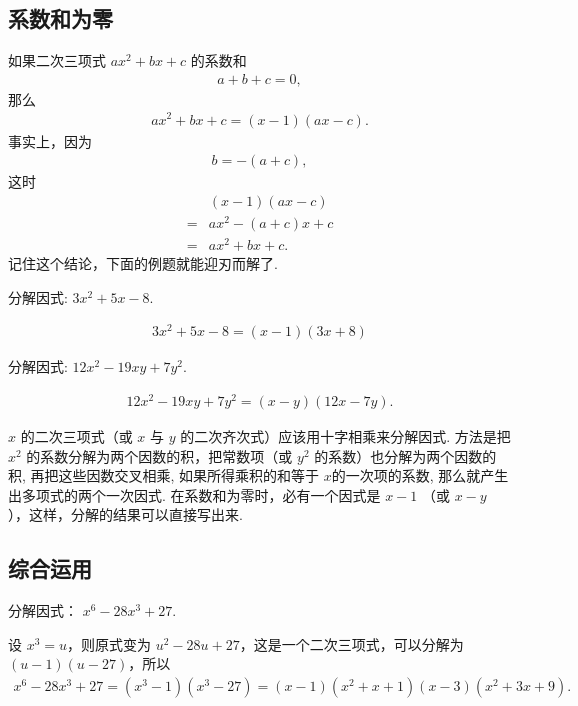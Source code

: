 \subsection{系数和为零}
如果二次三项式 $a x^{2}+b x+c$ 的系数和
\begin{align*}
	a+b+c=0,
\end{align*}
那么
\begin{align*}
	a x^{2}+b x+c=(x-1)(a x-c) .
\end{align*}
事实上，因为
\begin{align*}
	b=-(a+c),
\end{align*}
这时
\begin{align*}
	  & (x-1)(a x-c)      \\
	= & a x^{2}-(a+c) x+c \\
	= & a x^{2}+b x+c .
\end{align*}
记住这个结论，下面的例题就能迎刃而解了.

\begin{example}
	分解因式: $3 x^{2}+5 x-8$.
\end{example}
\begin{solution}
	\begin{align*}
		3 x^{2}+5 x-8=(x-1)(3 x+8)
	\end{align*}
\end{solution}

\begin{example}
	分解因式: $12 x^{2}-19 x y+7 y^{2}$.
\end{example}
\begin{solution}
	\begin{align*}
		12 x^{2}-19 x y+7 y^{2}=(x-y)(12 x-7 y) .
	\end{align*}
\end{solution}
\begin{note}
	$x$ 的二次三项式（或 $x$ 与 $y$ 的二次齐次式）应该用十字相乘来分解因式. 方法是把 $x^{2}$ 的系数分解为两个因数的积，把常数项（或 $y^{2}$ 的系数）也分解为两个因数的积, 再把这些因数交叉相乘, 如果所得乘积的和等于 $x$的一次项的系数, 那么就产生出多项式的两个一次因式. 在系数和为零时，必有一个因式是 $x-1$ （或 $x-y$ ），这样，分解的结果可以直接写出来.
\end{note}

\subsection{综合运用}
\begin{example}[换元]
	分解因式： $x^{6}-28 x^{3}+27.$
\end{example}
\begin{solution}
	设 $x^{3}=u$，则原式变为 $u^{2}-28 u+27$，这是一个二次三项式，可以分解为 $(u-1)(u-27)$，所以
	\begin{align*}
		x^{6}-28 x^{3}+27=(x^{3}-1)(x^{3}-27)=(x-1)(x^{2}+x+1)(x-3)(x^{2}+3 x+9).
	\end{align*}
\end{solution}

